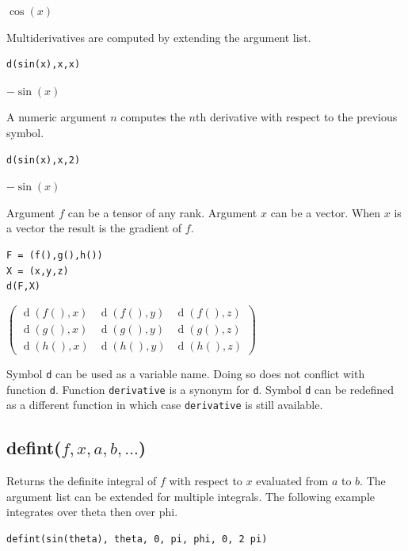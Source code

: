 \documentclass[12pt]{article}
\begin{document}
$\cos(x)$

\bigskip
Multiderivatives are computed by extending the argument list.

{\color{blue}
\begin{verbatim}
d(sin(x),x,x)
\end{verbatim}
}

$-\sin(x)$

\bigskip
A numeric argument $n$ computes the $n$th derivative with respect to the previous symbol.

{\color{blue}
\begin{verbatim}
d(sin(x),x,2)
\end{verbatim}
}

$-\sin(x)$

\bigskip
Argument $f$ can be a tensor of any rank.
Argument $x$ can be a vector.
When $x$ is a vector the result is the gradient of $f$.

{\color{blue}
\begin{verbatim}
F = (f(),g(),h())
X = (x,y,z)
d(F,X)
\end{verbatim}
}

$\displaystyle
\begin{pmatrix}
\operatorname{d}(f(),x) & \operatorname{d}(f(),y) &  \operatorname{d}(f(),z)
\\[1ex]
\operatorname{d}(g(),x) & \operatorname{d}(g(),y) &  \operatorname{d}(g(),z)
\\[1ex]
\operatorname{d}(h(),x) & \operatorname{d}(h(),y) &  \operatorname{d}(h(),z)
\end{pmatrix}
$

\bigskip
Symbol \verb$d$ can be used as a variable name.
Doing so does not conflict with function \verb$d$.
Function \verb$derivative$ is a synonym for \verb$d$.
Symbol \verb$d$ can be redefined as a different function in which case
\verb$derivative$ is still available.

\subsection*{defint($f,x,a,b,\ldots$)}

Returns the definite integral of $f$ with respect to $x$
evaluated from $a$ to $b$.
The argument list can be extended for multiple integrals.
The following example integrates over theta then over phi.

{\color{blue}
\begin{verbatim}
defint(sin(theta), theta, 0, pi, phi, 0, 2 pi)
\end{verbatim}
}
\end{document}
